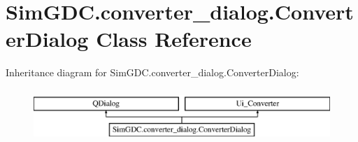 \hypertarget{class_sim_g_d_c_1_1converter__dialog_1_1_converter_dialog}{}\section{Sim\+G\+D\+C.\+converter\+\_\+dialog.\+Converter\+Dialog Class Reference}
\label{class_sim_g_d_c_1_1converter__dialog_1_1_converter_dialog}
Inheritance diagram for Sim\+G\+D\+C.\+converter\+\_\+dialog.\+Converter\+Dialog\+:\begin{figure}[H]
\begin{center}
\leavevmode
\includegraphics[height=2.000000cm]{class_sim_g_d_c_1_1converter__dialog_1_1_converter_dialog}
\end{center}
\end{figure}
